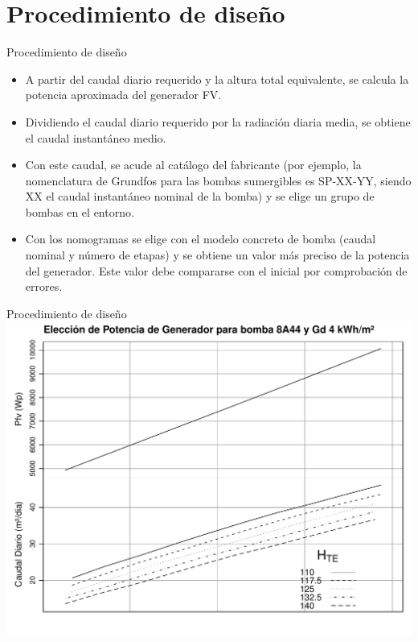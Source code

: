 \documentclass[xcolor={usenames,svgnames,dvipsnames}]{beamer}
\begin{document}
\section{Procedimiento de diseño}
\label{sec-3}


\begin{frame}[label=sec-3-1]{Procedimiento de diseño}
\begin{itemize}
\item A partir del caudal diario requerido y la altura total equivalente,
se calcula la potencia aproximada del generador FV.

\item Dividiendo el caudal diario requerido por la radiación diaria media,
se obtiene el caudal instantáneo medio.

\item Con este caudal, se acude al catálogo del fabricante (por ejemplo, la
nomenclatura de Grundfos para las bombas sumergibles es SP-XX-YY,
siendo XX el caudal instantáneo nominal de la bomba) y se elige un
grupo de bombas en el entorno.

\item Con los nomogramas se elige con el modelo concreto de bomba (caudal
nominal y número de etapas) y se obtiene un valor más preciso de la
potencia del generador. Este valor debe compararse con el inicial por
comprobación de errores.
\end{itemize}
\end{frame}

\begin{frame}[label=sec-3-2]{Procedimiento de diseño}
\includegraphics[width=.9\linewidth]{../figs/AbacoBomba.pdf}
\end{frame}
\end{document}
